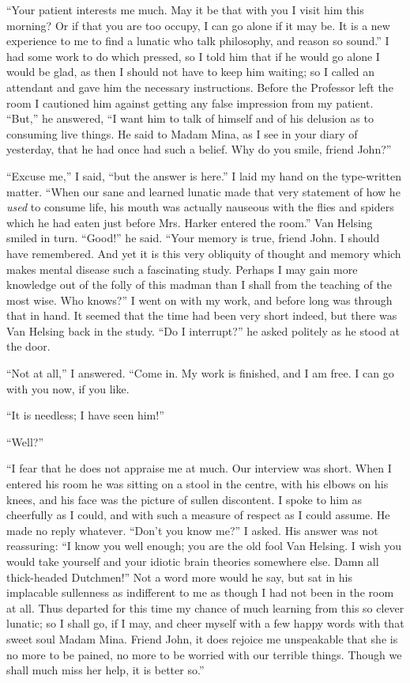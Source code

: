 \documentclass[12pt,openright]{book}
\begin{document}
“Your patient interests me much. May it be that with you I visit him this morning? Or if that you are too occupy, I can go alone if it may be. It is a new experience to me to find a lunatic who talk philosophy, and reason so sound.” I had some work to do which pressed, so I told him that if he would go alone I would be glad, as then I should not have to keep him waiting; so I called an attendant and gave him the necessary instructions. Before the Professor left the room I cautioned him against getting any false impression from my patient. “But,” he answered, “I want him to talk of himself and of his delusion as to consuming live things. He said to Madam Mina, as I see in your diary of yesterday, that he had once had such a belief. Why do you smile, friend John?”

“Excuse me,” I said, “but the answer is here.” I laid my hand on the type-written matter. “When our sane and learned lunatic made that very statement of how he \textit{used} to consume life, his mouth was actually nauseous with the flies and spiders which he had eaten just before Mrs. Harker entered the room.” Van Helsing smiled in turn. “Good!” he said. “Your memory is true, friend John. I should have remembered. And yet it is this very obliquity of thought and memory which makes mental disease such a fascinating study. Perhaps I may gain more knowledge out of the folly of this madman than I shall from the teaching of the most wise. Who knows?” I went on with my work, and before long was through that in hand. It seemed that the time had been very short indeed, but there was Van Helsing back in the study. “Do I interrupt?” he asked politely as he stood at the door.

“Not at all,” I answered. “Come in. My work is finished, and I am free. I can go with you now, if you like.

“It is needless; I have seen him!”

“Well?”

“I fear that he does not appraise me at much. Our interview was short. When I entered his room he was sitting on a stool in the centre, with his elbows on his knees, and his face was the picture of sullen discontent. I spoke to him as cheerfully as I could, and with such a measure of respect as I could assume. He made no reply whatever. “Don’t you know me?” I asked. His answer was not reassuring: “I know you well enough; you are the old fool Van Helsing. I wish you would take yourself and your idiotic brain theories somewhere else. Damn all thick-headed Dutchmen!” Not a word more would he say, but sat in his implacable sullenness as indifferent to me as though I had not been in the room at all. Thus departed for this time my chance of much learning from this so clever lunatic; so I shall go, if I may, and cheer myself with a few happy words with that sweet soul Madam Mina. Friend John, it does rejoice me unspeakable that she is no more to be pained, no more to be worried with our terrible things. Though we shall much miss her help, it is better so.”
\end{document}
